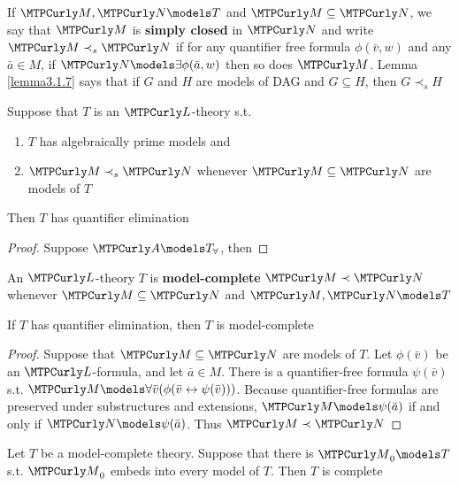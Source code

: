 \documentclass[11pt]{article}
\begin{document}
If \(\calm,\caln\models T\) and \(\calm\subseteq\caln\), we say that
\(\calm\) is \textbf{simply closed} in \(\caln\) and write \(\calm\prec_s\caln\) if
for any quantifier free formula \(\phi(\bar{v},w)\) and any \(\bar{a}\in M\),
if \(\caln\models\exists\phi(\bar{a},w)\) then so does \(\calm\). Lemma
\ref{lemma3.1.7} says that if \(G\) and \(H\) are models of DAG and
\(G\subseteq H\), then \(G\prec_s H\)

\begin{corollary}[]
Suppose that \(T\) is an \(\call\)-theory s.t.
\begin{enumerate}
\item \(T\) has algebraically prime models and
\item \(\calm\prec_s\caln\) whenever \(\calm\subseteq\caln\) are models of
\(T\)
\end{enumerate}


Then \(T\) has quantifier elimination
\end{corollary}

\begin{proof}
Suppose \(\cala\models T_\forall\), then 
\end{proof}


\begin{definition}[]
An \(\call\)-theory \(T\) is \textbf{model-complete} \(\calm\prec\caln\) whenever
\(\calm\subseteq\caln\) and \(\calm,\caln\models T\)
\end{definition}

\begin{proposition}[]
If \(T\) has quantifier elimination, then \(T\) is model-complete
\end{proposition}

\begin{proof}
Suppose that \(\calm\subseteq\caln\) are models of \(T\). Let \(\phi(\bar{v})\)
be an \(\call\)-formula, and let \(\bar{a}\in M\). There is a quantifier-free
formula \(\psi(\bar{v})\) s.t. \(\calm\models\forall\bar{v}(\phi(\bar{v}\leftrightarrow\psi(\bar{v})))\).
Because quantifier-free formulas are preserved under substructures and
extensions, \(\calm\models\psi(\bar{a})\) if and only if
\(\caln\models\psi(\bar{a})\). Thus \(\calm\prec\caln\)
\end{proof}

\begin{proposition}[]
Let \(T\) be a model-complete theory. Suppose that there is
\(\calm_0\models T\) s.t. \(\calm_0\) embeds into every model of \(T\). Then
\(T\) is complete
\end{proposition}
\end{document}

